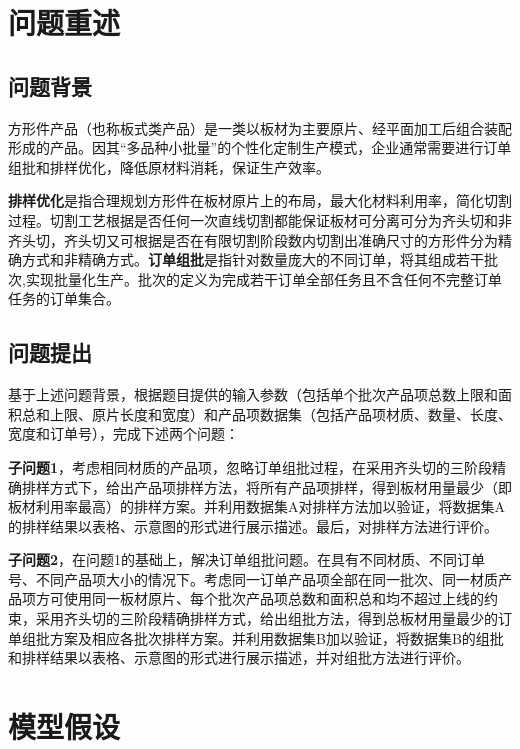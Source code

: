\documentclass[bwprint]{gmcmthesis}
\begin{document}

\section{问题重述}
\subsection{问题背景}

方形件产品（也称板式类产品）是一类以板材为主要原片、经平面加工后组合装配形成的产品。因其“多品种小批量”的个性化定制生产模式，企业通常需要进行订单组批和排样优化，降低原材料消耗，保证生产效率。

\textbf{排样优化}是指合理规划方形件在板材原片上的布局，最大化材料利用率，简化切割过程。切割工艺根据是否任何一次直线切割都能保证板材可分离可分为齐头切和非齐头切，齐头切又可根据是否在有限切割阶段数内切割出准确尺寸的方形件分为精确方式和非精确方式。\textbf{订单组批}是指针对数量庞大的不同订单，将其组成若干批次,实现批量化生产。批次的定义为完成若干订单全部任务且不含任何不完整订单任务的订单集合。



\subsection{问题提出}
基于上述问题背景，根据题目提供的输入参数（包括单个批次产品项总数上限和面积总和上限、原片长度和宽度）和产品项数据集（包括产品项材质、数量、长度、宽度和订单号），完成下述两个问题：

\textbf{子问题1}，考虑相同材质的产品项，忽略订单组批过程，在采用齐头切的三阶段精确排样方式下，给出产品项排样方法，将所有产品项排样，得到板材用量最少（即板材利用率最高）的排样方案。并利用数据集A对排样方法加以验证，将数据集A的排样结果以表格、示意图的形式进行展示描述。最后，对排样方法进行评价。

\textbf{子问题2}，在问题1的基础上，解决订单组批问题。在具有不同材质、不同订单号、不同产品项大小的情况下。考虑同一订单产品项全部在同一批次、同一材质产品项方可使用同一板材原片、每个批次产品项总数和面积总和均不超过上线的约束，采用齐头切的三阶段精确排样方式，给出组批方法，得到总板材用量最少的订单组批方案及相应各批次排样方案。并利用数据集B加以验证，将数据集B的组批和排样结果以表格、示意图的形式进行展示描述，并对组批方法进行评价。

\newpage

\section{模型假设}
\end{document}
